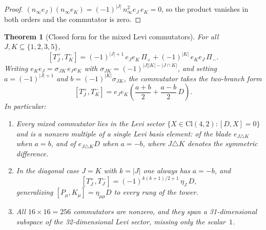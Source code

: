\documentclass{birkjour}
\newtheorem{thm}{Theorem}[section]
\theoremstyle{definition}
\theoremstyle{remark}
\numberwithin{equation}{section}
\newcommand{\Cl}{\mathrm{Cl}}
\newcommand{\ninf}{n_{\infty}}
\newenvironment{revblock}{}{}
\begin{document}
\begin{proof}
$(\ninf  e_J)(\ninf  e_K)
=(-1)^{|J|}\,\ninf^2 e_J\, e_K=0$,
so the product vanishes in both orders and the
commutator is zero.
\end{proof}

\begin{thm}[Closed form for the mixed Levi commutators]
\label{thm:mixed}
\begin{revblock}
For all $J,K\subseteq\{1,2,3,5\}$,
\begin{equation}\label{eq:levi-closed}
[T^+_J,T^-_K]
=(-1)^{|J|+1}\,e_J e_K\,\Pi_+
+(-1)^{|K|}\,e_K e_J\,\Pi_-.
\end{equation}
Writing $e_K e_J=\sigma_{JK}\,e_J e_K$ with
$\sigma_{JK}=(-1)^{|J||K|-|J\cap K|}$, and setting
$a=(-1)^{|J|+1}$ and $b=(-1)^{|K|}\sigma_{JK}$, the
commutator takes the two-branch form
\begin{equation}\label{eq:levi-branch}
[T^+_J,T^-_K]
=e_J e_K\left(\frac{a+b}{2}+\frac{a-b}{2}\,D\right).
\end{equation}
In particular:
\begin{enumerate}[label=\textup{(\alph*)}]
\item Every mixed commutator lies in the Levi sector
$\{X\in\Cl(4,2):[D,X]=0\}$ and is a nonzero multiple of a
single Levi basis element: of the blade $e_{J\triangle K}$
when $a=b$, and of $e_{J\triangle K}D$ when $a=-b$, where
$J\triangle K$ denotes the symmetric difference.
\item In the diagonal case $J=K$ with $k=|J|$ one always
has $a=-b$, and
\begin{equation}\label{eq:levi-diag}
[T^+_J,T^-_J]=(-1)^{k(k+1)/2+1}\,\eta_J\,D,
\end{equation}
generalizing $[P_\mu,K_\mu]=\eta_{\mu\mu}D$ to every rung
of the tower.
\item All $16\times16=256$ commutators are nonzero, and
they span a 31-dimensional subspace of the 32-dimensional
Levi sector, missing only the scalar~$1$.
\end{enumerate}
\end{revblock}
\end{thm}
\end{document}
